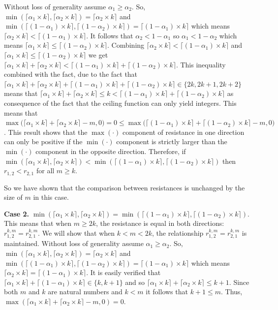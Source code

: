 Without loss of generality assume $\alpha_1 \geq \alpha_2$. So, $\min(\lceil \alpha_1 \times k \rceil,\lceil \alpha_2 \times k \rceil) = \lceil \alpha_2 \times k \rceil$ and $\min(\lceil (1-\alpha_1) \times k \rceil,\lceil (1-\alpha_2) \times k \rceil) = \lceil (1-\alpha_1) \times k \rceil$ which means $\lceil \alpha_2 \times k \rceil < \lceil (1-\alpha_1) \times k \rceil$. It follows that $\alpha_2< 1- \alpha_1$ so $\alpha_1< 1 - \alpha_2$ which means $\lceil \alpha_1 \times k \rceil \leq \lceil (1 - \alpha_2) \times k \rceil$. Combining $\lceil \alpha_2 \times k \rceil < \lceil (1-\alpha_1) \times k \rceil$ and  $\lceil \alpha_1 \times k \rceil \leq \lceil (1 - \alpha_2) \times k \rceil$ we get $\lceil \alpha_1 \times k \rceil+\lceil \alpha_2 \times k \rceil < \lceil (1-\alpha_1) \times k \rceil+\lceil (1-\alpha_2) \times k \rceil$. This inequality combined with the fact, due to the fact that $\lceil \alpha_1 \times k \rceil+\lceil \alpha_2 \times k \rceil + \lceil (1-\alpha_1) \times k \rceil+\lceil (1-\alpha_2) \times k \rceil \in \{2k, 2k+1, 2k+2\}$ means that $\lceil \alpha_1 \times k \rceil+\lceil \alpha_2 \times k \rceil \leq k < \lceil (1-\alpha_1) \times k \rceil+\lceil (1-\alpha_2) \times k \rceil$ as consequence of the fact that the ceiling function can only yield integers. This means that $\max\big(\lceil \alpha_1 \times k \rceil+\lceil \alpha_2 \times k \rceil-m,0\big) = 0 \leq \max\big(\lceil (1-\alpha_1) \times k \rceil+\lceil (1-\alpha_2) \times k \rceil-m,0\big)$. This result shows that the $\max(\cdot)$ component of resistance in one direction can only be positive if the $\min(\cdot)$ component is strictly larger than the $\min(\cdot)$ component in the opposite direction.
Therefore, if $\min(\lceil \alpha_1 \times k \rceil,\lceil \alpha_2 \times k \rceil) < \min(\lceil (1-\alpha_1) \times k \rceil,\lceil (1-\alpha_2) \times k \rceil)$ then $r_{1,2} < r_{2,1}$ for all $m \geq k$.

So we have shown that the comparison between resistances is unchanged by the size of $m$ in this case. 

{\bf Case 2.} $\min(\lceil \alpha_1 \times k \rceil,\lceil \alpha_2 \times k \rceil) = \min(\lceil (1-\alpha_1) \times k \rceil,\lceil (1-\alpha_2) \times k \rceil)$.\\
This means that when $m \geq 2k$, the resistance is equal in both directions: $r^{k,m}_{1,2} = r^{k,m}_{2,1}$.
We will show that when $k < m < 2k$, the relationship $r^{k,m}_{1,2} = r^{k,m}_{2,1}$ is maintained. Without loss of generality assume $\alpha_1\geq \alpha_2$. So, $\min(\lceil \alpha_1 \times k \rceil,\lceil \alpha_2 \times k \rceil) = \lceil \alpha_2 \times k \rceil$ and $\min(\lceil (1-\alpha_1) \times k \rceil,\lceil (1-\alpha_2) \times k \rceil) = \lceil (1-\alpha_1) \times k \rceil$ which means $\lceil \alpha_2 \times k \rceil = \lceil (1-\alpha_1) \times k \rceil$. It is easily verified that $\lceil \alpha_1 \times k \rceil+\lceil (1-\alpha_1) \times k \rceil \in \{k, k+1\}$ and so $\lceil \alpha_1 \times k \rceil+\lceil \alpha_2 \times k \rceil \leq k+1$. Since both $m$ and $k$ are natural numbers and $k<m$ it follows that $k+1 \leq m$. Thus, $\max(\lceil \alpha_1 \times k \rceil+\lceil \alpha_2 \times k \rceil-m,0) = 0$.

